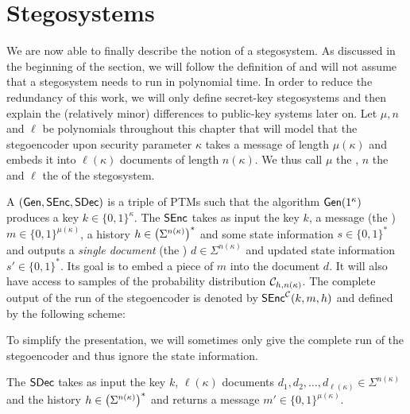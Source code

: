 \section{Stegosystems}
We are now able to finally describe the notion of a stegosystem. As
discussed in the beginning of the section, we will follow the definition
of \cite{hopper2009provably} and will not assume that a stegosystem
needs to run in polynomial time. In order to reduce the redundancy of
this work, we will only define secret-key stegosystems and then
explain the (relatively minor) differences to public-key systems later
on. Let $\mu,n$ and $\ell$ be polynomials throughout this chapter that
will model that the stegoencoder upon security parameter $\kappa$ takes
a message of length $\mu(\kappa)$ and embeds it into $\ell(\kappa)$
documents of length $n(\kappa)$. We thus call $\mu$ the , $n$ the  and $\ell$ the  of the stegosystem. 


A 
$(\operatorname{\mathsf{Gen}},\operatorname{\mathsf{SEnc}},\operatorname{\mathsf{SDec}})$ is a triple of \acp{PTM} such that the algorithm
$\operatorname{\mathsf{Gen}}(1^{\kappa})$ produces a key $k\in \{0,1\}^{\kappa}$.
The  $\operatorname{\mathsf{SEnc}}$ takes as input the key $k$, a
message (the ) $m\in \{0,1\}^{\mu(\kappa)}$, a history $h\in
\left(\Sigma^{n(\kappa)}\right)^{*}$ and some state information $s\in
\{0,1\}^{*}$ and outputs a \emph{single document} (the
) $d\in
\Sigma^{n(\kappa)}$ and updated state information $s'\in
\{0,1\}^{*}$. Its goal is to embed a piece of $m$ into the document
$d$. It will also have access to samples of the probability distribution
$\mathcal{C}_{h,n(\kappa)}$. The complete output of the run of the
stegoencoder is denoted by $\operatorname{\mathsf{SEnc}}^{\mathcal{C}}(k,m,h)$ and defined by the
following scheme:

To simplify the presentation, we will sometimes only give the complete
run of the stegoencoder and thus ignore the state information.

The  $\operatorname{\mathsf{SDec}}$ takes as input the key $k$, $\ell(\kappa)$ documents
$d_{1},d_{2},\ldots,d_{\ell(\kappa)}\in \Sigma^{n(\kappa)}$ and the history
$h\in \left(\Sigma^{n(\kappa)}\right)^{*}$ and returns
a message $m'\in \{0,1\}^{\mu(\kappa)}$. 

